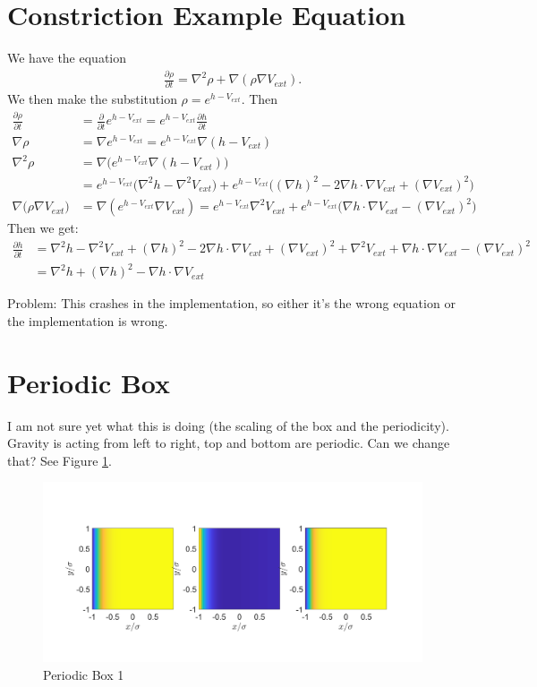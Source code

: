 \documentclass[11pt, a4paper]{article}
\theoremstyle{definition}
\begin{document}
\section{Constriction Example Equation}
We have the equation
\begin{align*}
\frac{\partial \rho}{\partial t} = \nabla^2 \rho + \nabla( \rho \nabla V_{ext}).
\end{align*}
We then make the substitution $\rho = e^{h - V_{ext}}$.
Then 
\begin{align*}
\frac{\partial \rho}{\partial t} &= \frac{\partial}{\partial t} e^{h - V_{ext}} = e^{h - V_{ext}}\frac{\partial h}{\partial t}\\
\nabla \rho &= \nabla e^{h - V_{ext}} = e^{h - V_{ext}} \nabla(h - V_{ext})\\
\nabla^2 \rho &= \nabla \bigg(e^{h - V_{ext}}\nabla(h - V_{ext}) \bigg) \\
&= e^{h - V_{ext}} \bigg(\nabla^2 h - \nabla^2 V_{ext} \bigg) + e^{h - V_{ext}} \bigg( (\nabla h)^2 - 2 \nabla h \cdot \nabla V_{ext} + (\nabla V_{ext})^2 \bigg)\\
\nabla\bigg(\rho \nabla V_{ext}\bigg) &= \nabla( e^{h - V_{ext}} \nabla V_{ext}) = e^{h - V_{ext}} \nabla^2 V_{ext} + e^{h - V_{ext}} \bigg(\nabla h \cdot \nabla V_{ext} - (\nabla V_{ext})^2  \bigg)
\end{align*}
Then we get:
\begin{align*}
\frac{\partial h}{\partial t} &= \nabla^2 h - \nabla^2 V_{ext} + (\nabla h)^2 - 2 \nabla h \cdot \nabla V_{ext} + (\nabla V_{ext})^2 +\nabla^2 V_{ext} + \nabla h \cdot \nabla V_{ext} - (\nabla V_{ext})^2\\
&= \nabla^2 h + (\nabla h)^2 - \nabla h \cdot \nabla V_{ext} 
\end{align*}

Problem: This crashes in the implementation, so either it's the wrong equation or the implementation is wrong.

\section{Periodic Box}
I am not sure yet what this is doing (the scaling of the box and the periodicity). Gravity is acting from left to right, top and bottom are periodic. Can we change that? See Figure \ref{F1}.
\begin{figure}[h]
	\centering
	\includegraphics[scale=0.25]{P1.png}
	\caption{Periodic Box 1} 
	\label{F1}
\end{figure} 
\end{document}
